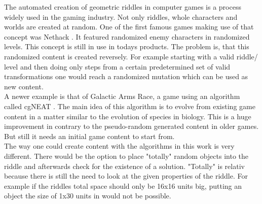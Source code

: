 \newline
The automated creation of geometric riddles in computer games is a process widely used in the gaming industry. Not only riddles, whole characters and worlds are created at random.
One of the first famous games making use of that concept was Nethack \cite{nethack}. It featured randomized enemy characters in randomized levels. This concept is still in use in todays products. The problem is, that this randomized content is created reversely. For example starting with a valid riddle/ level and then  doing only steps from a certain predetermined set of valid transformations one would reach a randomized mutation which can be used as new content.\\
A newer example is that of Galactic Arms Race, a game using an algorithm called cgNEAT \cite{cgNEAT}. The main idea of this algorithm is to evolve from existing game content in a matter similar to the evolution of species in biology. This is a huge improvement in contrary to the pseudo-random generated content in older games. But still it needs an initial game content to start from.\\
The way one could create content with the algorithms in this work is very different. There would be the option to place "totally" random objects into the riddle and afterwards check for the existence of a solution. "Totally" is relativ because there is still the need to look at the given properties of the riddle. For example if the riddles total space should only be 16x16 units big, putting an object the size of 1x30 units in would not be possible.

